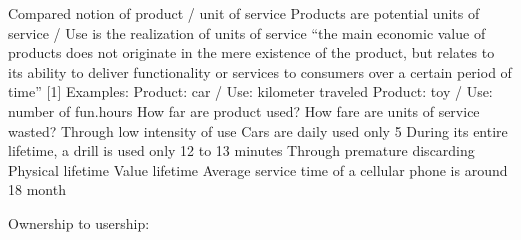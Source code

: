 \documentclass{article}
\begin{document}
Compared notion of product / unit of service
Products are potential units of service / Use is the realization of units of service
``the main economic value of products does not originate in the mere existence of the product, but relates to its ability to deliver functionality or services to consumers over a certain period of time'' [1]
Examples: 
Product: car / Use: kilometer traveled
Product: toy / Use: number of fun.hours
How far are product used? How fare are units of service wasted?
Through low intensity of use
Cars are daily used only 5%
During its entire lifetime, a drill is used only 12 to 13 minutes %
Through premature discarding
Physical lifetime  Value lifetime 
Average service time of a cellular phone is around 18 month



Ownership to usership: %




\end{document}
